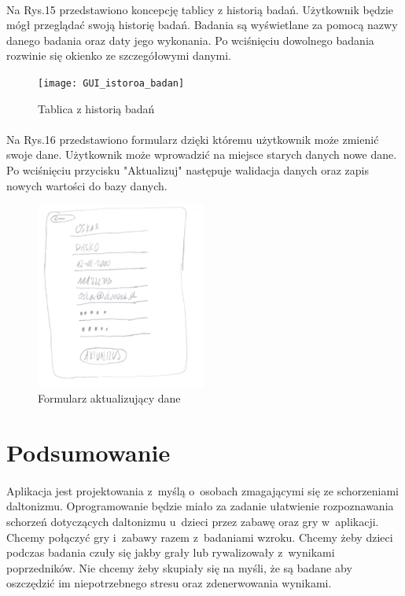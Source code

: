 \documentclass[12pt, letterpaper]{article}
\begin{document}
\newapge
		
\paragraph{}
Na Rys.15 przedstawiono koncepcję tablicy z historią badań. Użytkownik będzie mógł przeglądać  swoją historię badań. Badania są wyświetlane za pomocą nazwy danego badania oraz daty jego wykonania. Po wciśnięciu dowolnego badania rozwinie się okienko ze szczegółowymi danymi.
		
\begin{figure}[h]
  \centering
      \texttt{[image: GUI\_istoroa\_badan]}
  \caption{Tablica z historią badań}
\end{figure}

\newapage
		

\paragraph{}Na Rys.16 przedstawiono formularz dzięki któremu użytkownik może zmienić swoje dane. Użytkownik może wprowadzić na miejsce starych danych nowe dane. Po wciśnięciu przycisku "Aktualizuj" następuje walidacja danych oraz zapis nowych wartości do bazy danych.
		
\begin{figure}[h]
  \centering
      \includegraphics[width=0.5\textwidth]{GUI_zmiana_danych}
  \caption{Formularz aktualizujący dane}
\end{figure}

\newpage		
\section{Podsumowanie}
\paragraph{}
Aplikacja jest projektowania z~myślą o~osobach zmagającymi się ze schorzeniami daltonizmu. Oprogramowanie będzie miało za zadanie ułatwienie rozpoznawania schorzeń dotyczących daltonizmu u~dzieci przez zabawę oraz gry w~aplikacji. Chcemy połączyć gry i~zabawy razem z~badaniami wzroku. Chcemy żeby dzieci podczas badania czuły się jakby grały lub rywalizowały z~wynikami poprzedników. Nie chcemy żeby skupiały się na myśli, że są badane aby oszczędzić im niepotrzebnego stresu oraz zdenerwowania wynikami.
 
\end{document}
